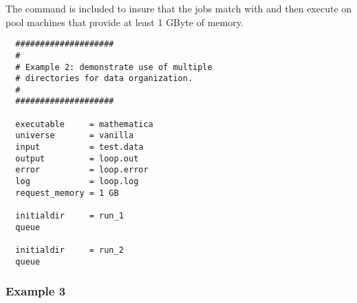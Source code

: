 The  command is included to insure
that the  jobs match with and then execute on
pool machines that provide at least 1 GByte of memory.

\begin{verbatim}
  ####################     
  #                       
  # Example 2: demonstrate use of multiple     
  # directories for data organization.      
  #                                        
  ####################                    
                                         
  executable     = mathematica          
  universe       = vanilla                   
  input          = test.data                
  output         = loop.out                
  error          = loop.error             
  log            = loop.log                                                    
  request_memory = 1 GB
                                  
  initialdir     = run_1         
  queue                         
                               
  initialdir     = run_2      
  queue                     
\end{verbatim}

\subsubsection{Example 3}

